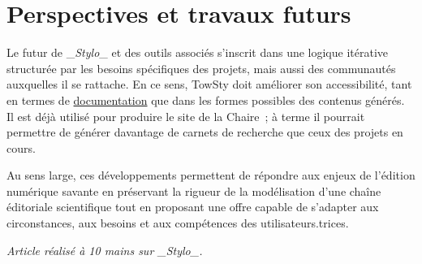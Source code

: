 \documentclass[final, fra]{anthology-ch}      %
\begin{document}
\section{Perspectives et travaux
futurs}\label{perspectives-et-travaux-futurs}

Le futur de \_\emph{Stylo}\_ et des outils associés s'inscrit dans une
logique itérative structurée par les besoins spécifiques des projets,
mais aussi des communautés auxquelles il se rattache. En ce sens, TowSty
doit améliorer son accessibilité, tant en termes de
\href{https://towsty-jl-6b585d.gitpages.huma-num.fr/}{documentation} que
dans les formes possibles des contenus générés. Il est déjà utilisé pour
produire le site de la Chaire~; à terme il pourrait permettre de
générer davantage de carnets de recherche que ceux des projets en cours.

Au sens large, ces développements permettent de répondre aux enjeux de
l'édition numérique savante en préservant la rigueur de la modélisation
d'une chaîne éditoriale scientifique tout en proposant une offre capable
de s'adapter aux circonstances, aux besoins et aux compétences des
utilisateurs.trices.

\vspace{1cm}
\emph{Article réalisé à 10 mains sur \_\emph{Stylo}\_.}

\printbibliography
\end{document}
